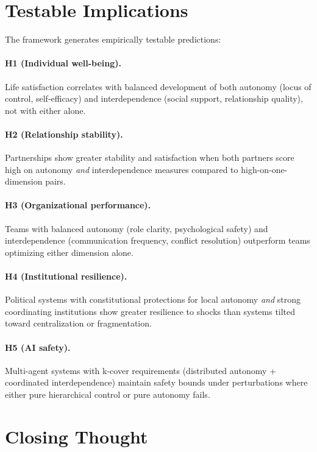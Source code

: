 \documentclass[11pt,a4paper]{article}
\begin{document}
\section{Testable Implications}

The framework generates empirically testable predictions:

\paragraph{H1 (Individual well-being).} Life satisfaction correlates with balanced development of both autonomy (locus of control, self-efficacy) and interdependence (social support, relationship quality), not with either alone.

\paragraph{H2 (Relationship stability).} Partnerships show greater stability and satisfaction when both partners score high on autonomy \emph{and} interdependence measures compared to high-on-one-dimension pairs.

\paragraph{H3 (Organizational performance).} Teams with balanced autonomy (role clarity, psychological safety) and interdependence (communication frequency, conflict resolution) outperform teams optimizing either dimension alone.

\paragraph{H4 (Institutional resilience).} Political systems with constitutional protections for local autonomy \emph{and} strong coordinating institutions show greater resilience to shocks than systems tilted toward centralization or fragmentation.

\paragraph{H5 (AI safety).} Multi-agent systems with k-cover requirements (distributed autonomy + coordinated interdependence) maintain safety bounds under perturbations where either pure hierarchical control or pure autonomy fails.

\section{Closing Thought}
\end{document}
